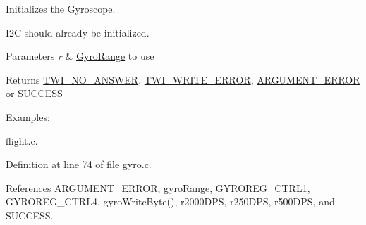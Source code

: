 Initializes the Gyroscope. 

I2\-C should already be initialized. 
\begin{DoxyParams}{Parameters}
{\em r} & \hyperlink{group__gyro_ga12b0e0572fdceaa90874f9364c862ead}{Gyro\-Range} to use \\
\hline
\end{DoxyParams}
\begin{DoxyReturn}{Returns}
\hyperlink{group__error_gga2c3e4bb40f36b262a5214e2da2bca9c5a04d5943ba652af2205c88b247e0c659c}{T\-W\-I\-\_\-\-N\-O\-\_\-\-A\-N\-S\-W\-E\-R}, \hyperlink{group__error_gga2c3e4bb40f36b262a5214e2da2bca9c5ac0e3b3463dcaf220e54794b4711708c9}{T\-W\-I\-\_\-\-W\-R\-I\-T\-E\-\_\-\-E\-R\-R\-O\-R}, \hyperlink{group__error_gga2c3e4bb40f36b262a5214e2da2bca9c5a49ccf277a69dd938c591928aa27c66cc}{A\-R\-G\-U\-M\-E\-N\-T\-\_\-\-E\-R\-R\-O\-R} or \hyperlink{group__error_gga2c3e4bb40f36b262a5214e2da2bca9c5ac7f69f7c9e5aea9b8f54cf02870e2bf8}{S\-U\-C\-C\-E\-S\-S} 
\end{DoxyReturn}
\begin{Desc}
\item[Examples\-: ]\par
\hyperlink{flight_8c-example}{flight.\-c}.\end{Desc}


Definition at line 74 of file gyro.\-c.



References A\-R\-G\-U\-M\-E\-N\-T\-\_\-\-E\-R\-R\-O\-R, gyro\-Range, G\-Y\-R\-O\-R\-E\-G\-\_\-\-C\-T\-R\-L1, G\-Y\-R\-O\-R\-E\-G\-\_\-\-C\-T\-R\-L4, gyro\-Write\-Byte(), r2000\-D\-P\-S, r250\-D\-P\-S, r500\-D\-P\-S, and S\-U\-C\-C\-E\-S\-S.



